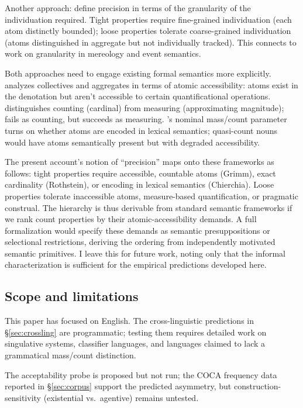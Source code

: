 \documentclass[12pt,a4paper]{article}
\begin{document}
Another approach: define precision in terms of the granularity of the individuation required. Tight properties require fine-grained individuation (each atom distinctly bounded); loose properties tolerate coarse-grained individuation (atoms distinguished in aggregate but not individually tracked). This connects to work on granularity in mereology and event semantics.

Both approaches need to engage existing formal semantics more explicitly. \textcite{grimm2018} analyzes collectives and aggregates in terms of atomic accessibility: atoms exist in the denotation but aren't accessible to certain quantificational operations. \textcite{rothstein2010} distinguishes counting (cardinal) from measuring (approximating magnitude);  fails as counting, but  succeeds as measuring. \textcite{chierchia1998}'s nominal mass/count parameter turns on whether atoms are encoded in lexical semantics; quasi-count nouns would have atoms semantically present but with degraded accessibility.

The present account's notion of ``precision'' maps onto these frameworks as follows: tight properties require accessible, countable atoms (Grimm), exact cardinality (Rothstein), or encoding in lexical semantics (Chierchia). Loose properties tolerate inaccessible atoms, measure-based quantification, or pragmatic construal. The hierarchy is thus derivable from standard semantic frameworks if we rank count properties by their atomic-accessibility demands. A full formalization would specify these demands as semantic presuppositions or selectional restrictions, deriving the ordering from independently motivated semantic primitives. I leave this for future work, noting only that the informal characterization is sufficient for the empirical predictions developed here.

\subsection{Scope and limitations}

This paper has focused on English. The cross-linguistic predictions in \S\ref{sec:crossling} are programmatic; testing them requires detailed work on singulative systems, classifier languages, and languages claimed to lack a grammatical mass/count distinction.

The  acceptability probe is proposed but not run; the COCA frequency data reported in \S\ref{sec:corpus} support the predicted asymmetry, but construction-sensitivity (existential vs.\ agentive) remains untested.
\end{document}
